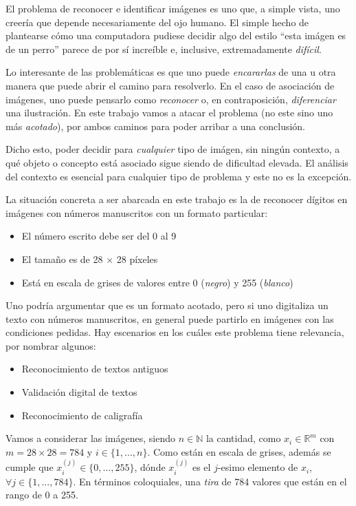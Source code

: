 El problema de reconocer e identificar im\'agenes es uno que, a simple vista, uno creer\'ia que depende necesariamente del ojo humano. El simple hecho de plantearse c\'omo una computadora pudiese decidir algo del estilo ``esta im\'agen es de un perro'' parece de por s\'i incre\'ible e, inclusive, extremadamente \textit{dif\'icil}.

Lo interesante de las problem\'aticas es que uno puede \textit{encararlas} de una u otra manera que puede abrir el camino para resolverlo. En el caso de asociaci\'on de im\'agenes, uno puede pensarlo como \textit{reconocer} o, en contraposici\'on, \textit{diferenciar} una ilustraci\'on. En este trabajo vamos a atacar el problema (no este sino uno m\'as \textit{acotado}), por ambos caminos para poder arribar a una conclusi\'on.

Dicho esto, poder decidir para \textit{cualquier} tipo de im\'agen, sin ning\'un contexto, a qu\'e objeto o concepto est\'a asociado sigue siendo de dificultad elevada. El an\'alisis del contexto es esencial para cualquier tipo de problema y este no es la excepci\'on.

La situaci\'on concreta a ser abarcada en este trabajo es la de reconocer d\'igitos en im\'agenes con n\'umeros manuscritos con un formato particular:

\begin{itemize}
\item El n\'umero escrito debe ser del 0 al 9
\item El tamaño es de 28 $\times$ 28 p\'ixeles
\item Est\'a en escala de grises de valores entre 0 (\textit{negro}) y 255 (\textit{blanco})
\end{itemize}

Uno podr\'ia argumentar que es un formato acotado, pero si uno digitaliza un texto con n\'umeros manuscritos, en general puede partirlo en im\'agenes con las condiciones pedidas. Hay escenarios en los cu\'ales este problema tiene relevancia, por nombrar algunos:

\begin{itemize}
\item Reconocimiento de textos antiguos
\item Validaci\'on digital de textos
\item Reconocimiento de caligraf\'ia
\end{itemize}

Vamos a considerar las im\'agenes, siendo $n \in \mathbb{N}$ la cantidad, como $x_{i} \in \mathbb{R}^{m}$ con $m = 28 \times 28 = 784$ y $i \in \{1, ..., n\}$. Como est\'an en escala de grises, adem\'as se cumple que $x_{i}^{(j)} \in \{0, ..., 255\}$, d\'onde $x_{i}^{(j)}$ es el $j$-esimo elemento de $x_{i}$, $\forall j \in \{1, ..., 784\}$. En t\'erminos coloquiales, una \textit{tira} de 784 valores que est\'an en el rango de 0 a 255.

